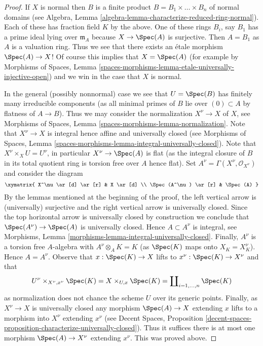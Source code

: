 \begin{proof}
\medskip\noindent
If $X$ is normal then $B$ is a finite product
$B = B_1 \times \ldots \times B_n$ of
normal domains (see Algebra, Lemma
\ref{algebra-lemma-characterize-reduced-ring-normal}). Each of
these has fraction field $K$ by the above. 
One of these rings $B_i$, say $B_1$ has a prime ideal lying over
$\mathfrak m_A$ because $X \to \Spec(A)$ is surjective.
Then $A = B_1$ as $A$ is a valuation ring. Thus we see that
there exists an \'etale morphism $\Spec(A) \to X$!
Of course this implies that $X = \Spec(A)$ (for example by
Morphisms of Spaces, Lemma
\ref{spaces-morphisms-lemma-etale-universally-injective-open}) and we win in
the case that $X$ is normal.

\medskip\noindent
In the general (possibly nonnormal) case we see that $U = \Spec(B)$
has finitely many irreducible components (as all minimal primes of $B$
lie over $(0) \subset A$ by flatness of $A \to B$). Thus we may consider
the normalization $X^\nu \to X$ of $X$, see
Morphisms of Spaces, Lemma \ref{spaces-morphisms-lemma-normalization}.
Note that $X^\nu \to X$ is integral hence affine and universally closed (see
Morphisms of Spaces, Lemma
\ref{spaces-morphisms-lemma-integral-universally-closed}).
Note that $X^\nu \times_X U = U^\nu$, in particular $X^\nu \to \Spec(A)$
is flat (as the integral closure of $B$ in its total quotient ring is
torsion free over $A$ hence flat). Set
$A^\nu = \Gamma(X^\nu, \mathcal{O}_{X^\nu})$ and consider the diagram
$$
\xymatrix{
X^\nu \ar[d] \ar[r] & X \ar[d] \\
\Spec(A^\nu) \ar[r] & \Spec(A)
}
$$
By the lemmas mentioned at the beginning of the proof, the left vertical
arrow is (universally) surjective and the right vertical arrow is
universally closed. Since the top horizontal arrow is universally closed by
construction we conclude that $\Spec(A^\nu) \to \Spec(A)$ is
universally closed. Hence $A \subset A^\nu$ is integral, see
Morphisms, Lemma \ref{morphisms-lemma-integral-universally-closed}.
Finally, $A^\nu$ is a torsion free $A$-algebra with $A^\nu \otimes_A K = K$
(as $\Spec(K)$ maps onto $X_K = X^\nu_K$). Hence $A = A^\nu$.
Observe that $x : \Spec(K) \to X$ lifts to $x^\nu : \Spec(K) \to X^\nu$
and that
$$
U^\nu \times_{X^\nu, x^\nu} \Spec(K) =
X \times_{U, x} \Spec(K) =
\coprod\nolimits_{i = 1, \ldots, n} \Spec(K)
$$
as normalization does not chance the scheme $U$ over its generic points.
Finally, as $X^\nu \to X$ is universally closed any morphism
$\Spec(A) \to X$ extending $x$ lifts to a morphism into $X^\nu$
extending $x^\nu$ (see Decent Spaces, Proposition
\ref{decent-spaces-proposition-characterize-universally-closed}).
Thus it suffices there is at most one morphism
$\Spec(A) \to X^\nu$ extending $x^\nu$. This was proved above.
\end{proof}

